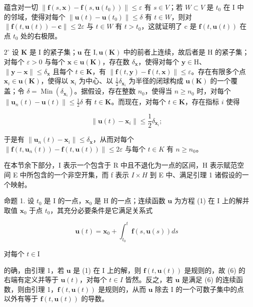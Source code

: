 蕴含对一切 \(\|\mathbf{f}(s,\mathbf{x})-\mathbf{f}(s,\mathbf{u}(t_{0}))\|\leqslant\varepsilon\) 有 \(s\in V\)；若 \(W\subset V\) 是 \(t_{0}\) 在 I 中的邻域，使得对每个 \(\|\mathbf{u}(t)-\mathbf{u}(t_{0})\|\leqslant\delta\) 有 \(t\in W\)，则对 \(\|\mathbf{f}(t,\mathbf{u}(t))-\mathbf{c}\|\leqslant2\varepsilon\) 与 \(t\in W\) 有 \(t>t_{0}\)，这就证明了 c 是 \(\mathbf{f}(t,\mathbf{u}(t))\) 在点 \(t_{0}\) 处的右极限。

\(2^{\circ}\) 设 \(\mathbf{K}\) 是 \(\mathrm{I}\) 的紧子集；\(\mathbf{u}\) 在 \(\mathrm{I}, \mathbf{u}(\mathbf{K})\) 中的前者上连续，故后者是 \(\mathrm{H}\) 的紧子集；对每个 \(\varepsilon > 0\) 与每个 \(\mathbf{x} \in \mathbf{u}(\mathbf{K})\)，存在数 \(\delta_{\mathbf{x}}\)，使得对每个 \(\mathbf{y} \in \mathrm{H}\)、\(\| \mathbf{y} - \mathbf{x} \| \leqslant \delta_{\mathbf{x}}\) 且每个 \(t \in \mathbf{K}\)，有 \(\| \mathbf{f}(t, \mathbf{y}) - \mathbf{f}(t, \mathbf{x}) \| \leqslant \varepsilon\)。存在有限多个点 \(\mathbf{x}_i \in \mathbf{u}(\mathbf{K})\)，使得以 \(\mathbf{x}_i\) 为中心、以 \(\frac{1}{2} \delta_{\mathbf{x}_i}\) 为半径的闭球构成 \(\mathbf{u}(\mathbf{K})\) 的一个覆盖；令 \(\delta = \operatorname{Min}\left(\delta_{\mathbf{x}_i}\right)\)。据假设，存在整数 \(n_0\)，使得当 \(n \geqslant n_0\) 时，对每个 \(\| \mathbf{u}_n(t) - \mathbf{u}(t) \| \leqslant \frac{1}{2} \delta\) 有 \(t \in \mathbf{K}\)。而现在，对每个 \(t \in \mathbf{K}\)，存在指标 \(i\) 使得

\[
\left\| \mathbf {u} (t) - \mathbf {x} _ {i} \right\| \leqslant \frac {1}{2} \delta_ {\mathbf {x} _ {i}};
\]

于是有 \(\|\mathbf{u}_{n}(t)-\mathbf{x}_{i}\|\leqslant\delta_{\mathbf{x}}\)，从而对每个 \(\|\mathbf{f}(t,\mathbf{u}_{n}(t))-\mathbf{f}(t,\mathbf{u}(t))\|\leqslant2\varepsilon\) 与每个 \(t\in K\) 有 \(n\geqslant n_{0}\)。

在本节余下部分，I 表示一个包含于 R 中且不退化为一点的区间，H 表示赋范空间 E 中所包含的一个非空开集，而 f 表示 \(I \times H\) 到 E 中、满足引理 1 诸假设的一个映射。

命题 1. 设 \(t_0\) 是 I 的一点，\(\mathbf{x}_0\) 是 H 的一点；连续函数 \(\mathbf{u}\) 为方程 (1) 在 I 上的解并取值 \(\mathbf{x}_0\) 于点 \(t_0\)，其充分必要条件是它满足关系式

\[
\mathbf {u} (t) = \mathbf {x} _ {0} + \int_ {t _ {0}} ^ {t} \mathbf {f} (s, \mathbf {u} (s)) d s\tag{6}
\]

对每个 \(t\in \mathrm{I}\)

的确，由引理 1，若 \(\mathbf{u}\) 是 (1) 在 I 上的解，则 \(\mathbf{f}(t, \mathbf{u}(t))\) 是规则的，故 (6) 的右端有定义并等于 \(\mathbf{u}(t)\)，对每个 \(t \in I\) 皆然。反之，若 \(\mathbf{u}\) 是满足 (6) 的连续函数，则由引理 1，\(\mathbf{f}(t, \mathbf{u}(t))\) 是规则的，从而 \(\mathbf{u}\) 除去 I 的一个可数子集中的点以外有等于 \(\mathbf{f}(t, \mathbf{u}(t))\) 的导数。

